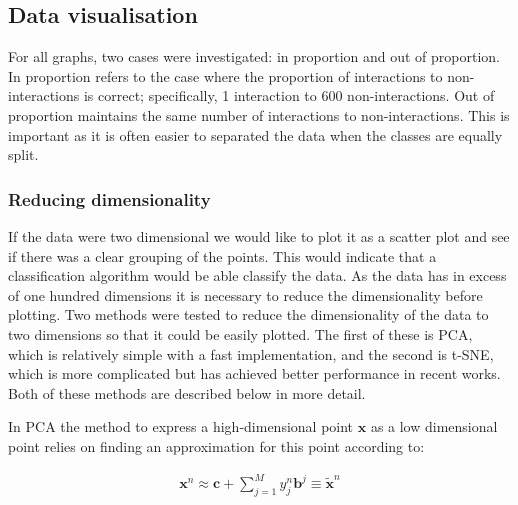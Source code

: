 
\subsection{Data visualisation}
\label{dataviz}

For all graphs, two cases were investigated: in proportion and out of proportion.
In proportion refers to the case where the proportion of interactions to non-interactions is correct; specifically, 1 interaction to 600 non-interactions.
Out of proportion maintains the same number of interactions to non-interactions.
This is important as it is often easier to separated the data when the classes are equally split.

\subsubsection*{Reducing dimensionality}
If the data were two dimensional we would like to plot it as a scatter plot and see if there was a clear grouping of the points.
This would indicate that a classification algorithm would be able classify the data.
As the data has in excess of one hundred dimensions it is necessary to reduce the dimensionality before plotting.
Two methods were tested to reduce the dimensionality of the data to two dimensions so that it could be easily plotted.
The first of these is \ac{PCA}, which is relatively simple with a fast implementation, and the second is t-SNE, which is more complicated but has achieved better performance in recent works.
Both of these methods are described below in more detail.

In \ac{PCA} the method to express a high-dimensional point $\pmb{x}$ as a low dimensional point relies on finding an approximation for this point according to\autocite[330]{barber_bayesian_2013}:


\begin{align}
    \pmb{x}^{n} \approx \pmb{c} + \sum_{j=1}^{M} y_{j}^{n} \pmb{b}^{j} \equiv \tilde{\pmb{x}}^{n}
\end{align}

